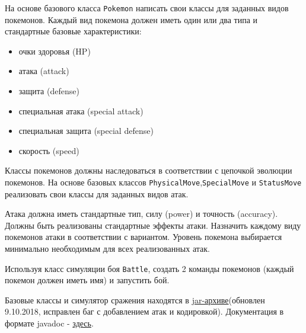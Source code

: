    


    \tableofcontents


    \newpage
    \Chapter{\lab\ \labnumber}{\labtheme}{}


%
    На основе базового класса \verb|Pokemon| написать свои классы для заданных видов покемонов.
    Каждый вид покемона должен иметь один или два типа и стандартные базовые характеристики:
    \begin{itemize}
        \item очки здоровья (HP)
        \item атака (attack)
        \item защита (defense)
        \item специальная атака (special attack)
        \item специальная защита (special defense)
        \item скорость (speed)
    \end{itemize}

    Классы покемонов должны наследоваться в соответствии с цепочкой эволюции покемонов.
    На основе базовых классов \verb|PhysicalMove|,\verb|SpecialMove| и \verb|StatusMove| реализовать свои классы для заданных видов атак.

    Атака должна иметь стандартные тип, силу (power) и точность (accuracy).
    Должны быть реализованы стандартные эффекты атаки.
    Назначить каждому виду покемонов атаки в соответствии с вариантом.
    Уровень покемона выбирается минимально необходимым для всех реализованных атак.

    Используя класс симуляции боя \verb|Battle|, создать 2 команды покемонов (каждый покемон должен иметь имя) и запустить бой.

    Базовые классы и симулятор сражения находятся в \href{https://se.ifmo.ru/documents/10180/660917/Pokemon.jar/a7ce60af-6ee6-47d0-a95e-e5ed9a697bd2}{jar-архиве}(обновлен 9.10.2018, исправлен баг с добавлением атак и кодировкой).
    Документация в формате javadoc - \href{https://se.ifmo.ru/~tony/doc/}{здесь}.

